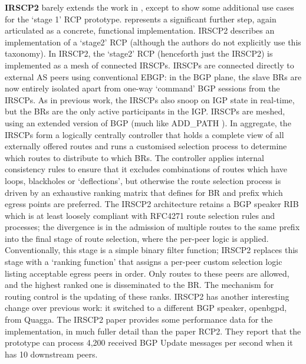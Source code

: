 \textbf{IRSCP2} \cite{VanDerMerwe2006} barely extends the work in \cite{Caesar2005}, except to show some additional use cases for the `stage 1' RCP prototype. \cite{Verkaik2007} represents a significant further step, again articulated as a concrete, functional implementation.
IRSCP2 describes an implementation of a `stage2' RCP (although the authors do not explicitly use this taxonomy).
In IRSCP2, the `stage2' RCP (henceforth just the IRSCP2) is implemented as a mesh of connected IRSCPs. IRSCPs are connected directly to external AS peers using conventional EBGP: in the BGP plane, the slave BRs are now entirely isolated apart from one-way `command' BGP sessions from the IRSCPs.
As in previous work, the IRSCPs also snoop on IGP state in real-time, but the BRs are the only active participants in the IGP.
IRSCPs are meshed, using an extended version of BGP (much like ADD\_PATH ).
In aggregate, the IRSCPs form a logically centrally controller that holds a complete view of all externally offered routes and runs a customised selection process to determine which routes to distribute to which BRs.
The controller applies internal consistency rules to ensure that it excludes combinations of routes which have loops, blackholes or `deflections', but otherwise the route selection process is driven by an exhaustive ranking matrix that defines for BR and prefix which egress points are preferred.
The IRSCP2 architecture retains a BGP speaker RIB which is at least loosely compliant with RFC4271 route selection rules and processes; the divergence is in the admission of multiple routes to the same prefix into the final stage of route selection, where the per-peer logic is applied.
Conventionally, this stage is a simple binary filter function; IRSCP2 replaces this stage with a `ranking function' that assigns a per-peer custom selection logic listing acceptable egress peers in order.
Only routes to these peers are allowed, and the highest ranked one is disseminated to the BR.
The mechanism for routing control is the updating of these ranks.
IRSCP2 has another interesting change over previous work: it switched to a different BGP speaker, openbgpd, from Quagga.
The IRSCP2 paper provides some performance data for the implementation, in much fuller detail than the paper RCP2.
They report that the prototype can process 4,200 received BGP Update messages per second when it has 10 downstream peers.

\bigskip


